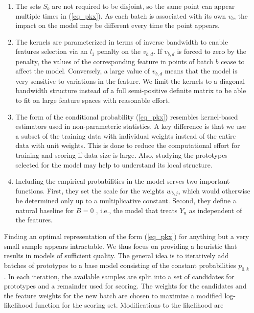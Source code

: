 %
\begin{remark}
\begin{enumerate}
\item The sets $S_b$ are not required to be disjoint, so the same point can appear multiple times in (\ref{eq_pkx}).
As each batch is associated with its own $v_b$, the impact on the model may be different every time the point appears.
%
\item The kernels are parameterized in terms of inverse bandwidth to enable features selection via an $l_1$ penalty on the $v_{b,d}$.
If $v_{b,d}$ is forced to zero by the penalty, the values of the corresponding feature in points of batch $b$ cease to affect the model.
Conversely, a large value of $v_{b,d}$ means that the model is very sensitive to variations in the feature.
We limit the kernels to a diagonal bandwidth structure instead of a full semi-positive definite matrix to be able to fit on large feature spaces with reasonable effort.
%
\item The form of the conditional probability (\ref{eq_pkx}) resembles kernel-based estimators used in non-parameteric statistics.
A key difference is that we use a subset of the training data with individual weights instead of the entire data with unit weights.
This is done to reduce the computational effort for training and scoring if data size is large.
Also, studying the prototypes selected for the model may help to understand its local structure.
%
\item Including the empirical probabilities in the model serves two important functions.
First, they set the scale for the weights $w_{b,j}$, which would otherwise be determined only up to a multiplicative constant.
Second, they define a natural baseline for $B=0$ , i.e., the model that treats $Y_n$ as independent of the features.
\end{enumerate}
\end{remark}
%
Finding an optimal representation of the form (\ref{eq_pkx}) for anything but a very small sample appears intractable.
We thus focus on providing a heuristic that results in models of sufficient quality.
The general idea is to iteratively add batches of prototypes to a base model consisting of the constant probabilities $p_{0,k}$.
In each iteration, the available samples are split into a set of candidates for prototypes and a remainder used for scoring.
The weights for the candidates and the feature weights for the new batch are chosen to maximize a modified log-likelihood function for the scoring set.
Modifications to the likelihood are
